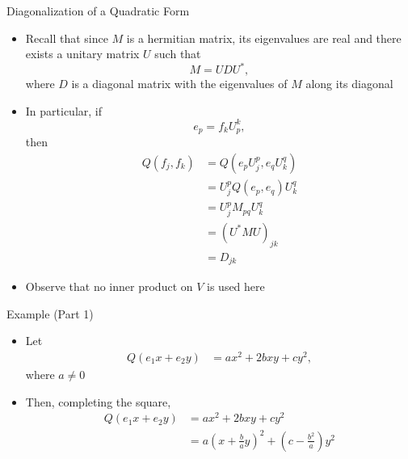 \documentclass[usenames,dvipsnames,10pt]{beamer}
\begin{document}
\begin{frame}
  {Diagonalization of a Quadratic Form}

  \begin{itemize}
  \item Recall that since $M$ is a hermitian matrix, its eigenvalues are real and there exists a unitary matrix $U$ such that
    \[ M = UDU^*, \]
    where $D$ is a diagonal matrix with the eigenvalues of $M$ along its diagonal
  \item In particular, if
    \[ e_p = f_kU^k_p, \]
    then
    \begin{align*}
      Q(f_j,f_k) &= Q(e_pU^p_j,e_qU^q_k)\\
                 &= U^p_jQ(e_p,e_q)U^q_k\\
                 &= U^p_jM_{pq}U^q_k\\
                 &= (U^*MU)_{jk}\\
                 &= D_{jk}
    \end{align*}
  \item Observe that no inner product on $V$ is used here
  \end{itemize}
\end{frame}

\begin{frame}
  {Example (Part 1)}

  \begin{itemize}
  \item Let
    \begin{align*}
      Q(e_1x +e_2y) &= ax^2 + 2bxy + cy^2,
    \end{align*}
    where $a \ne 0$
  \item Then, completing the square,
    \begin{align*}
      Q(e_1x +e_2y) &= ax^2 + 2bxy + cy^2\\
                    &= a\left(x + \frac{b}{a}y\right)^2 + \left(c-\frac{b^2}{a}\right)y^2
    \end{align*}
  \end{itemize}
\end{frame}
\end{document}
